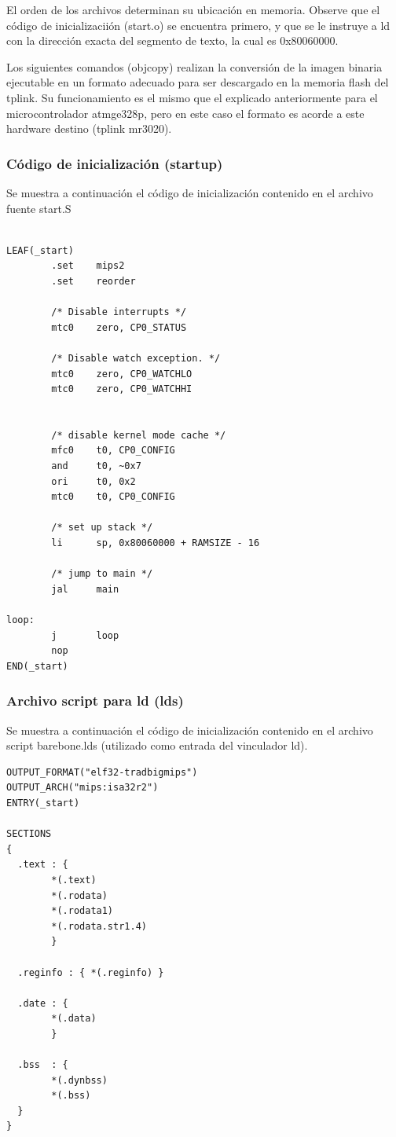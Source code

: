 \documentclass[output=paper, 
colorlinks,
citecolor=brown,
newtxmath
]{langscibook}
\begin{document}
El orden de los archivos determinan su ubicación en memoria. Observe
que el código de inicializaciión (start.o) se encuentra primero, y que
se le instruye a ld con la dirección exacta del segmento de texto,
la cual es 0x80060000.

Los siguientes comandos (objcopy) realizan la conversión de la imagen 
binaria ejecutable
en un formato adecuado para ser descargado en la memoria flash del tplink.
Su funcionamiento es el mismo que el explicado anteriormente 
para el microcontrolador atmge328p, pero en este caso el formato
es acorde a este hardware destino (tplink mr3020).


\subsubsection {Código de inicialización (startup)}

Se muestra a continuación el código de inicialización contenido en el archivo
fuente start.S

\begin{verbatim}

LEAF(_start)
        .set    mips2
        .set    reorder

        /* Disable interrupts */
        mtc0    zero, CP0_STATUS

        /* Disable watch exception. */
        mtc0    zero, CP0_WATCHLO
        mtc0    zero, CP0_WATCHHI


        /* disable kernel mode cache */
        mfc0    t0, CP0_CONFIG
        and     t0, ~0x7
        ori     t0, 0x2
        mtc0    t0, CP0_CONFIG

        /* set up stack */
        li      sp, 0x80060000 + RAMSIZE - 16

        /* jump to main */
        jal     main

loop:
        j       loop
        nop
END(_start)
\end{verbatim}

\subsubsection {Archivo script para ld (lds)}

Se muestra a continuación el código de inicialización contenido en el archivo
script barebone.lds (utilizado como entrada del vinculador ld). 

\begin{verbatim}
OUTPUT_FORMAT("elf32-tradbigmips")
OUTPUT_ARCH("mips:isa32r2")
ENTRY(_start)

SECTIONS
{
  .text : {
        *(.text)
        *(.rodata)
        *(.rodata1)
        *(.rodata.str1.4)
        }

  .reginfo : { *(.reginfo) }

  .date : {
        *(.data)
        }

  .bss  : {
        *(.dynbss)
        *(.bss)
  }
}
\end{verbatim}
\end{document}
